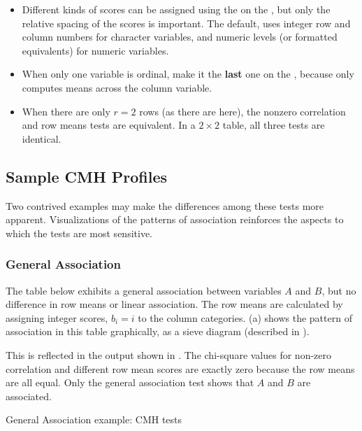 \begin{itemize}
\item Different kinds of scores can be assigned using the
on the , but only the
relative spacing of the scores is important.
The default,  uses integer row and column numbers
for character variables, and numeric levels (or formatted equivalents)
for numeric variables.

\item When only one variable is ordinal, make it the {\bf last} one
       on the , because  only computes
       means across the column variable.
\item When there are only $r=2$ rows (as there are here), the 
nonzero correlation and row
       means tests are equivalent.
		 In a $2 \times 2$ table, all three tests are identical.
\end{itemize}

\subsection{Sample CMH Profiles}\label{sec:Sample}

Two contrived examples may make the differences among these tests
more apparent.  Visualizations of the patterns of association
reinforces the aspects to which the tests are most sensitive.

\subsubsection{General Association}
The table below exhibits a
general association between variables $A$ and $B$, but no difference in
row means or linear association.  The row means are calculated by
assigning integer scores, $b_i = i$ to the column categories.
(a) shows
the pattern of association in this table graphically, as a sieve diagram
(described in ).



This is reflected in the  output shown in
.
The chi-square values for non-zero correlation and different
row mean scores are exactly zero because the row means are all equal.
Only the general association test shows that $A$ and $B$
are associated.
\begin{Output}[ht]
\caption{General Association example: CMH tests}\label{out:cmhdemo.1}
\small

\end{Output}

